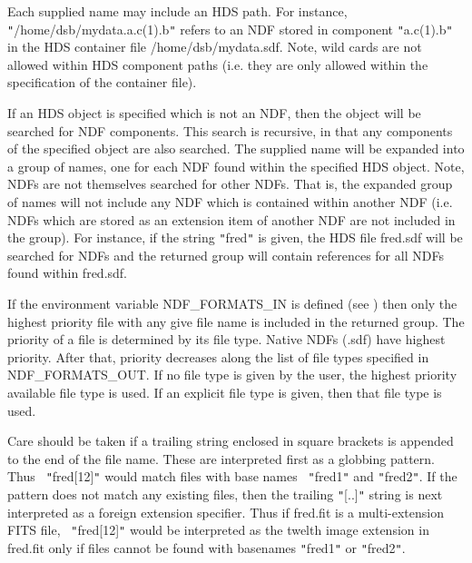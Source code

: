 {{{         \sstitem
         Each supplied name may include an HDS path. For instance,
         {\tt "}/home/dsb/mydata.a.c(1).b{\tt "} refers to an NDF stored in component
         {\tt "}a.c(1).b{\tt "} in the HDS container file /home/dsb/mydata.sdf. Note,
         wild cards are not allowed within HDS component paths (i.e. they
         are only allowed within the specification of the container file).

         \sstitem
         If an HDS object is specified which is not an NDF, then the
         object will be searched for NDF components. This search is
         recursive, in that any components of the specified object are also
         searched. The supplied name will be expanded into a group of names,
         one for each NDF found within the specified HDS object. Note, NDFs
         are not themselves searched for other NDFs. That is, the expanded
         group of names will not include any NDF which is contained within
         another NDF (i.e. NDFs which are stored as an extension item of
         another NDF are not included in the group). For instance, if the
         string {\tt "}fred{\tt "} is given, the HDS file fred.sdf will be searched for
         NDFs and the returned group will contain references for all NDFs
         found within fred.sdf.

         \sstitem
         If the environment variable NDF\_FORMATS\_IN is defined (see
         ) then only the highest priority file with any give file name
         is included in the returned group. The priority of a file is
         determined by its file type. Native NDFs (.sdf) have highest
         priority. After that, priority decreases along the list of file
         types specified in NDF\_FORMATS\_OUT. If no file type is given by
         the user, the highest priority available file type is used. If an
         explicit file type is given, then that file type is used.

         \sstitem

         Care should be taken if a trailing string enclosed in square
	 brackets is appended to the end of the file name. These are
	 interpreted first as a globbing pattern. Thus {\tt
	 "}fred[12]{\tt "} would match files with base names {\tt
	 "}fred1{\tt "} and {\tt "}fred2{\tt "}. If the pattern does not
	 match any existing files, then the trailing {\tt "}[..]{\tt "}
	 string is next interpreted as a foreign extension specifier.
	 Thus if fred.fit is a multi-extension FITS file, {\tt
	 "}fred[12]{\tt "} would be interpreted as the twelth image
	 extension in fred.fit only if files cannot be found with
	 basenames {\tt "}fred1{\tt "} or {\tt "}fred2{\tt "}.

}}}
